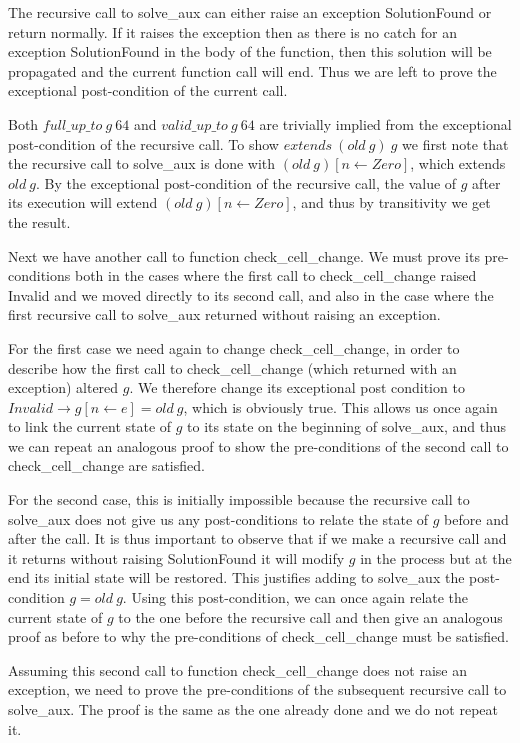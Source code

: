 \documentclass[]{StandardTemplate}
\begin{document}
The recursive call to solve\_aux can either raise an exception SolutionFound or return normally. If it raises the exception then as there is no catch for an exception SolutionFound in the body of the function, then this solution will be propagated and the current function call will end. Thus we are left to prove the exceptional post-condition of the current call.

Both $ full\_up\_to~g~64 $ and $ valid\_up\_to~g~64 $ are trivially implied from the exceptional post-condition of the recursive call. To show $ extends~(old~g)~g $ we first note that the recursive call to solve\_aux is done with $ (old~g)[n \leftarrow Zero] $, which extends $ old~g $. By the exceptional post-condition of the recursive call, the value of $ g $ after its execution will extend $ (old~g)[n \leftarrow Zero]  $, and thus by transitivity we get the result.

Next we have another call to function check\_cell\_change. We must prove its pre-conditions both in the cases where the first call to check\_cell\_change raised Invalid and we moved directly to its second call, and also in the case where the first recursive call to solve\_aux returned without raising an exception.

For the first case we need again to change check\_cell\_change, in order to describe how the first call to check\_cell\_change (which returned with an exception) altered $ g $. We therefore change its exceptional post condition to $ Invalid \to g[n \leftarrow e] = old~g $, which is obviously true. This allows us once again to link the current state of $ g $ to its state on the beginning of solve\_aux, and thus we can repeat an analogous proof to show the pre-conditions of the second call to check\_cell\_change are satisfied.

For the second case, this is initially impossible because the recursive call to solve\_aux does not give us any post-conditions to relate the state of $ g $ before and after the call. It is thus important to observe that if we make a recursive call and it returns without raising SolutionFound it will modify $ g $ in the process but at the end its initial state will be restored. This justifies adding to solve\_aux the post-condition $ g = old~g $. Using this post-condition, we can once again relate the current state of $ g $ to the one before the recursive call and then give an analogous proof as before to why the pre-conditions of check\_cell\_change must be satisfied.

Assuming this second call to function check\_cell\_change does not raise an exception, we need to prove the pre-conditions of the subsequent recursive call to solve\_aux. The proof is the same as the one already done and we do not repeat it.
\end{document}
